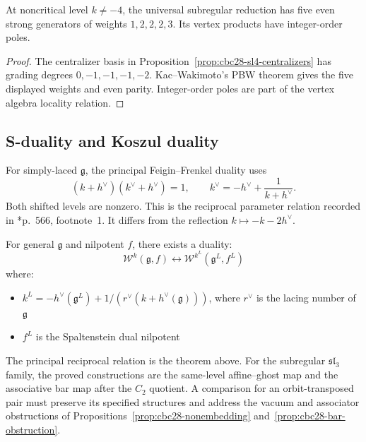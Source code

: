 \begin{theorem}\label{thm:w-algebra-sl4}
At noncritical level $k\ne-4$, the universal subregular reduction has five even strong generators of weights $1,2,2,2,3$.
Its vertex products have integer-order poles.
\end{theorem}
\begin{proof}
The centralizer basis in Proposition~\ref{prop:cbc28-sl4-centralizers} has grading degrees $0,-1,-1,-1,-2$.
Kac--Wakimoto's PBW theorem gives the five displayed weights and even parity.
Integer-order poles are part of the vertex algebra locality relation.
\end{proof}

\subsection{S-duality and Koszul duality}

\begin{theorem}\label{thm:ff-s-duality}
For simply-laced $\mathfrak g$, the principal Feigin--Frenkel duality uses
\[
 (k+h^\vee)(k^\vee+h^\vee)=1,
 \qquad k^\vee=-h^\vee+\frac{1}{k+h^\vee}.
\]
Both shifted levels are nonzero.
This is the reciprocal parameter relation recorded in
\cite{Ara15}*{p.~566, footnote~1}.
It differs from the reflection $k\mapsto-k-2h^\vee$.
\end{theorem}

\begin{conjecture}\label{conj:gw-s-duality}
For general $\mathfrak{g}$ and nilpotent $f$, there exists a duality:
\[
\mathcal{W}^k(\mathfrak{g}, f) \longleftrightarrow \mathcal{W}^{k^L}(\mathfrak{g}^L, f^L)
\]
where:
\begin{itemize}
\item $k^L = -h^{\vee}(\mathfrak{g}^L) + 1/(r^{\vee}(k + h^{\vee}(\mathfrak{g})))$, where $r^{\vee}$ is the lacing number of $\mathfrak{g}$
\item $f^L$ is the Spaltenstein dual nilpotent
\end{itemize}
\end{conjecture}

\begin{remark}[Scope]
The principal reciprocal relation is the theorem above.
For the subregular $\mathfrak{sl}_3$ family, the proved constructions are the same-level affine--ghost map and the associative bar map after the $C_2$ quotient.
A comparison for an orbit-transposed pair must preserve its specified structures and address the vacuum and associator obstructions of
Propositions~\ref{prop:cbc28-nonembedding} and~\ref{prop:cbc28-bar-obstruction}.
\end{remark}

